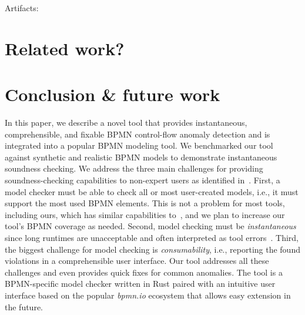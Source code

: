 \documentclass[
]{ceurart}
\begin{document}


Artifacts: \cite{timkrauterBPM2024Artifacts2024}

\section{Related work?} \label{sec:related-work}


\section{Conclusion \& future work} \label{sec:conclusion}

In this paper, we describe a novel tool that provides instantaneous, comprehensible, and fixable BPMN control-flow anomaly detection and is integrated into a popular BPMN modeling tool.
We benchmarked our tool against synthetic and realistic BPMN models to demonstrate instantaneous soundness checking.
We address the three main challenges for providing soundness-checking capabilities to non-expert users as identified in~\cite{fahlandAnalysisDemandInstantaneous2011}.
First, a model checker must be able to check all or most user-created models, i.e., it must support the most used BPMN elements.
This is not a problem for most tools, including ours, which has similar capabilities to~\cite{corradiniFormalApproachAnalysis2021}, and we plan to increase our tool's BPMN coverage as needed.
Second, model checking must be \textit{instantaneous} since long runtimes are unacceptable and often interpreted as tool errors~\cite{fahlandAnalysisDemandInstantaneous2011}.
Third, the biggest challenge for model checking is \textit{consumability}, i.e., reporting the found violations in a comprehensible user interface.
Our tool addresses all these challenges and even provides quick fixes for common anomalies.
The tool is a BPMN-specific model checker written in Rust paired with an intuitive user interface based on the popular \textit{bpmn.io} ecosystem that allows easy extension in the future.



\end{document}
